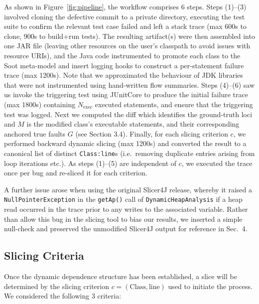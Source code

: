 \documentclass[sigconf,nonacm]{acmart}
\begin{document}
As shown in Figure~\ref{fig:pipeline}, the workflow comprises 6 steps. Steps (1)--(3) involved cloning the defective commit to a private directory, executing the test suite to confirm the relevant test case failed and left a stack trace (max 600s to clone, 900s to build+run tests). The resulting artifact(s) were then assembled into one JAR file (leaving other resources on the user's classpath to avoid issues with resource URIs), and the Java code instrumented to promote each class to the Soot meta-model and insert logging hooks to construct a per-statement failure trace (max 1200s). Note that we approximated the behaviour of JDK libraries that were not instrumented using hand-written flow summaries. Steps (4)--(6) saw us invoke the triggering test using JUnitCore to produce the initial failure trace (max 1800s) containing $N_{\text{exec}}$ executed statements, and ensure that the triggering test was logged. Next we computed the diff which identifies the ground-truth loci and $M$ is the modified class's executable statements, and their corresponding anchored true faults $G$ (see Section 3.4). Finally, for each slicing criterion $c$, we performed backward dynamic slicing (max 1200s) and converted the result to a canonical list of distinct \texttt{Class:line}s (i.e.\ removing duplicate entries arising from loop iterations etc.). As steps (1)--(5) are independent of $c$, we executed the trace once per bug and re-sliced it for each criterion.

A further issue arose when using the original Slicer4J release, whereby it raised a \texttt{NullPointerException} in the \texttt{getAp()} call of \texttt{DynamicHeapAnalysis} if a heap read occurred in the trace prior to any writes to the associated variable. Rather than allow this bug in the slicing tool to bias our results, we inserted a simple null-check and preserved the unmodified Slicer4J output for reference in Sec.\ 4.

\subsection{Slicing Criteria}

Once the dynamic dependence structure has been established, a slice will be determined by the slicing criterion $c=(\text{Class}, \text{line})$ used to initiate the process. We considered the following 3 criteria:
\end{document}
